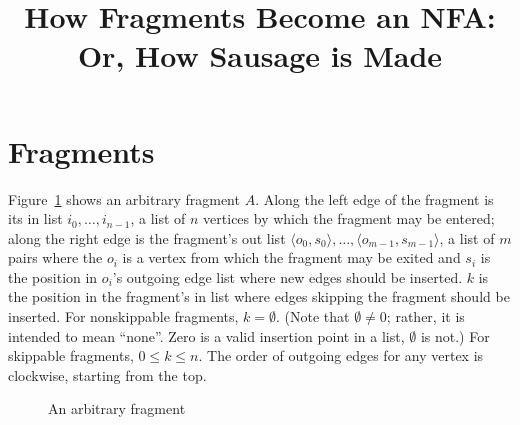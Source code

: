 \documentclass{article}
\begin{document}
\title{How Fragments Become an NFA:\\ Or, How Sausage is Made}
\maketitle

\section{Fragments}

Figure~\ref{fig:arbitrary} shows an arbitrary fragment $A$. Along the left edge of the fragment is its in list $i_0,\dots,i_{n-1}$, a list of $n$ vertices by which the fragment may be entered; along the right edge is the fragment's out list $\langle o_0,s_0\rangle,\dots,\langle o_{m-1},s_{m-1}\rangle$, a list of $m$ pairs where the $o_i$ is a vertex from which the fragment may be exited and $s_i$ is the position in $o_i$'s outgoing edge list where new edges should be inserted. $k$ is the position in the fragment's in list where edges skipping the fragment should be inserted. For nonskippable fragments, $k = \emptyset$. (Note that $\emptyset \ne 0$; rather, it is intended to mean ``none''. Zero is a valid insertion point in a list, $\emptyset$ is not.) For skippable fragments, $0 \le k \le n$. The order of outgoing edges for any vertex is clockwise, starting from the top.

\begin{figure}[h]
\centering
{}
\caption{An arbitrary fragment\label{fig:arbitrary}}
\end{figure}
\end{document}

